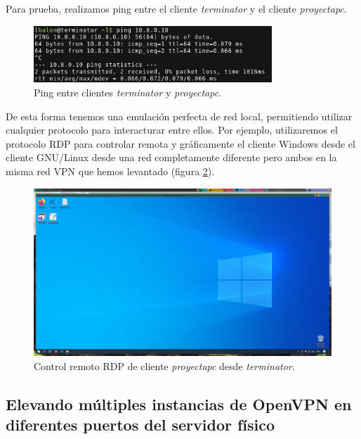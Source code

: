 \documentclass[a4paper, 11pt, titlepage]{article}
\begin{document}
        Para prueba, realizamos ping entre el cliente \textit{terminator} y el cliente \textit{proyectapc}.

        \begin{figure}[htp]
            \centering
            \includegraphics[width=0.8\textwidth]{resources/configs02.png}
            \caption{Ping entre clientes \textit{terminator} y \textit{proyectapc}.}
            \label{}
        \end{figure}  
    
        De esta forma tenemos una emulación perfecta de red local, permitiendo utilizar cualquier
        protocolo para interacturar entre ellos. Por ejemplo, utilizaremos el protocolo RDP para
        controlar remota y gráficamente el cliente Windows desde el cliente GNU/Linux desde una
        red completamente diferente pero ambos en la misma red VPN que hemos levantado (figura \ref{fig:configs03}).
    
        \begin{figure}[htp]
            \centering
            \includegraphics[width=1\textwidth]{resources/configs03.png}
            \caption{Control remoto RDP de cliente \textit{proyectapc} desde \textit{terminator}.}
            \label{fig:configs03}
        \end{figure} 
    
        \newpage

    \subsection{Elevando múltiples instancias de OpenVPN en diferentes puertos del servidor físico}
\end{document}
